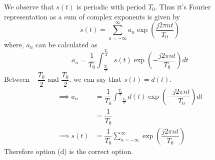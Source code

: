 \documentclass[journal,12pt,twocolumn]{IEEEtran}
\begin{document}
We observe that $s(t)$ is periodic with period $T_0$. Thus it's Fourier representation as a sum of complex exponents is given by
\begin{equation}
    s(t) = \sum_{n=-\infty}^{\infty}a_n\exp\left(\dfrac{j2\pi nt}{T_0}\right)
\end{equation}
where, $a_n$ can be calculated as
\begin{equation}
    a_n = \dfrac{1}{T_0}\int_{-\frac{T_0}{2}}^{\frac{T_0}{2}}s(t)\exp\left(-\dfrac{j2\pi nt}{T_0}\right)dt
\end{equation}
Between $-\dfrac{T_0}{2}$ and $\dfrac{T_0}{2}$, we can say that $s(t) = d(t)$.
\begin{align}
    \implies a_n &= \dfrac{1}{T_0}\int_{-\frac{T_0}{2}}^{\frac{T_0}{2}}d(t)\exp\left(-\dfrac{j2\pi nt}{T_0}\right)dt\\
        &= \dfrac{1}{T_0}\\
    \implies s(t) &= \dfrac{1}{T_0}\sum_{n=-\infty}^{\infty}\exp\left(\dfrac{j2\pi nt}{T_0}\right)
\end{align}
Therefore option (d) is the correct option.
\end{document}

